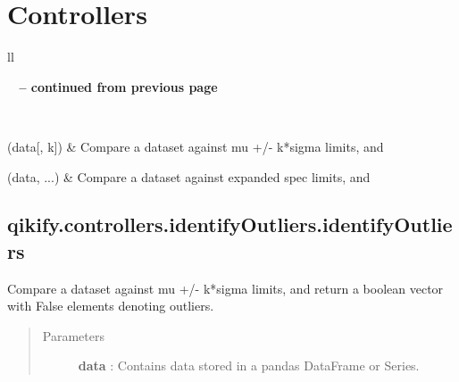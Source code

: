 \documentclass[letterpaper,10pt,english]{sphinxmanual}
\begin{document}
\section{Controllers}
\label{api:controllers}
\begin{longtable}{ll}
\hline
\endfirsthead

%
{{\bfseries \tablename\ \thetable{} -- continued from previous page}} \\
\hline
\endhead

\hline {} \\ \hline
\endfoot

\hline
\endlastfoot


{\hyperref[generated/qikify.controllers.identifyOutliers.identifyOutliers:qikify.controllers.identifyOutliers.identifyOutliers]{}}(data{[}, k{]})
 & 
Compare a dataset against mu +/- k*sigma limits, and
\\\hline

{\hyperref[generated/qikify.controllers.identifyOutliers.identifyOutliersSpecs:qikify.controllers.identifyOutliers.identifyOutliersSpecs]{}}(data, ...)
 & 
Compare a dataset against expanded spec limits, and
\\\hline
\end{longtable}



\subsection{qikify.controllers.identifyOutliers.identifyOutliers}
\label{generated/qikify.controllers.identifyOutliers.identifyOutliers:qikify-controllers-identifyoutliers-identifyoutliers}\label{generated/qikify.controllers.identifyOutliers.identifyOutliers::doc}

\begin{fulllineitems}
\label{generated/qikify.controllers.identifyOutliers.identifyOutliers:qikify.controllers.identifyOutliers.identifyOutliers}
Compare a dataset against mu +/- k*sigma limits, and
return a boolean vector with False elements denoting outliers.
\begin{quote}\begin{description}
\item[{Parameters }] \leavevmode
\textbf{data} : Contains data stored in a pandas DataFrame or Series.

\end{description}\end{quote}

\end{fulllineitems}
\end{document}
